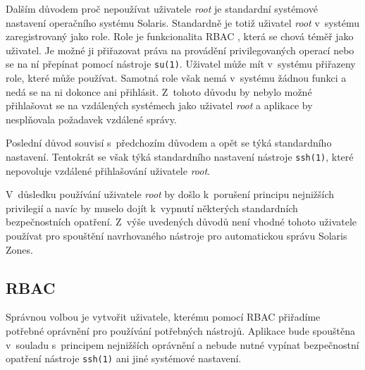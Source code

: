 Dalším důvodem proč nepoužívat uživatele \textit{root} je standardní systémové nastavení operačního systému Solaris. Standardně
je totiž uživatel \textit{root} v~systému zaregistrovaný jako role. Role je funkcionalita RBAC \cite{oracle:solaris:desing:rbac},
která se chová téměř jako uživatel. Je možné ji přiřazovat práva na provádění privilegovaných operací nebo se na ní přepínat pomocí
nástroje \verb|su(1)|. Uživatel může mít v~systému přiřazeny role, které může používat. Samotná role však nemá v~systému žádnou
funkci a nedá se na ni dokonce ani přihlásit. Z~tohoto důvodu by nebylo možné přihlašovat se na vzdálených systémech jako uživatel
\textit{root} a aplikace by nesplňovala požadavek vzdálené správy.

Poslední důvod souvisí s~předchozím důvodem a opět se týká standardního nastavení. Tentokrát se však týká standardního nastavení nástroje
\verb|ssh(1)|, které nepovoluje vzdálené přihlašování uživatele \textit{root}.

V~důsledku používání uživatele \textit{root} by došlo k~porušení principu nejnižších privilegií 
\cite{cvut:presentations:least_user_privilege} a navíc by muselo dojít k~vypnutí některých standardních bezpečnostních opatření.
Z~výše uvedených důvodů není vhodné tohoto uživatele používat pro spouštění navrhovaného nástroje pro automatickou správu Solaris Zones.
\subsection{RBAC}
\label{chapter:design:security:rbac}
Správnou volbou je vytvořit uživatele, kterému pomocí RBAC přiřadíme potřebné oprávnění pro používání potřebných nástrojů.
Aplikace bude spouštěna v~souladu s~principem nejnižších oprávnění a nebude nutné vypínat bezpečnostní
opatření nástroje \verb|ssh(1)| ani jiné systémové nastavení.